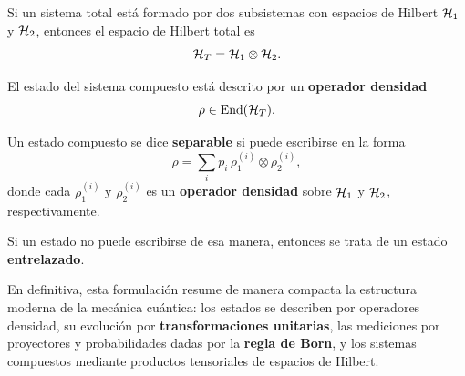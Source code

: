 \documentclass[../main.tex]{subfiles}
\begin{document}
Si un sistema total está formado por dos subsistemas con espacios de Hilbert $\mathcal{H}_1$ y $\mathcal{H}_2$, entonces el espacio de Hilbert total es
\begin{equation*}
    \mathcal{H}_T = \mathcal{H}_1 \otimes \mathcal{H}_2.
\end{equation*}

El estado del sistema compuesto está descrito por un \textbf{operador densidad}
\begin{equation*}
    \rho \in \operatorname{End}(\mathcal{H}_T).
\end{equation*}

Un estado compuesto se dice \textbf{separable} si puede escribirse en la forma
\begin{equation*}
    \rho = \sum_i p_i\, \rho_1^{(i)}\otimes \rho_2^{(i)},
\end{equation*}
donde cada $\rho_1^{(i)}$ y $\rho_2^{(i)}$ es un \textbf{operador densidad} sobre $\mathcal{H}_1$ y $\mathcal{H}_2$, respectivamente.

Si un estado no puede escribirse de esa manera, entonces se trata de un estado \textbf{entrelazado}.

En definitiva, esta formulación resume de manera compacta la estructura moderna de la mecánica cuántica: los estados se describen por operadores densidad, su evolución por \textbf{transformaciones unitarias}, las mediciones por proyectores y probabilidades dadas por la \textbf{regla de Born}, y los sistemas compuestos mediante productos tensoriales de espacios de Hilbert.

\newpage
\end{document}
